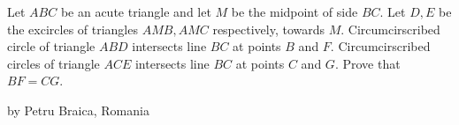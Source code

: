 Let $ABC$ be an acute triangle and let $M$ be the midpoint of side $BC$. Let $D,E$ be the excircles of triangles $AMB,AMC$ respectively, towards $M$. Circumcirscribed circle of triangle $ABD$ intersects line $BC$ at points $B$ and $F$. Circumcirscribed circles of triangle $ACE$ intersects line $BC$ at points $C$ and $G$. Prove that $BF=CG$.

by Petru Braica, Romania